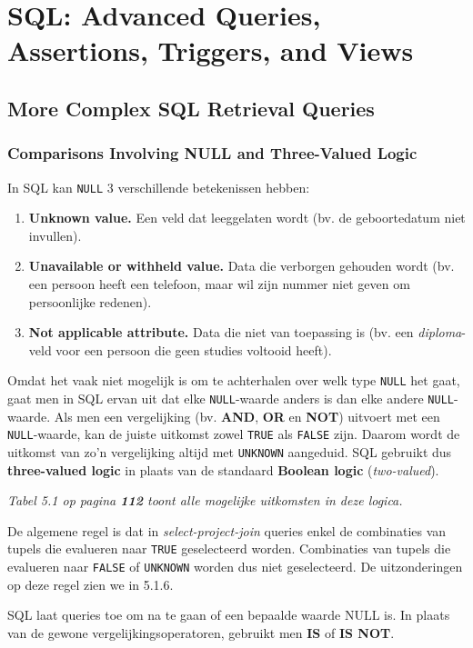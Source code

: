 \chapter{SQL: Advanced Queries, Assertions, Triggers, and Views}
\section{More Complex SQL Retrieval Queries}
\subsection{Comparisons Involving NULL and Three-Valued Logic}
In SQL kan \texttt{NULL} 3 verschillende betekenissen hebben:
\begin{enumerate}
\item \textbf{Unknown value.} Een veld dat leeggelaten wordt (bv. de geboortedatum niet invullen).
\item \textbf{Unavailable or withheld value.} Data die verborgen gehouden wordt (bv. een persoon heeft een telefoon, maar wil zijn nummer niet geven om persoonlijke redenen).
\item \textbf{Not applicable attribute.} Data die niet van toepassing is (bv. een \textit{diploma}-veld voor een persoon die geen studies voltooid heeft).
\end{enumerate}
Omdat het vaak niet mogelijk is om te achterhalen over welk type \texttt{NULL} het gaat, gaat men in SQL ervan uit dat elke \texttt{NULL}-waarde anders is dan elke andere \texttt{NULL}-waarde. Als men een vergelijking (bv. \textbf{AND}, \textbf{OR} en \textbf{NOT}) uitvoert met een \texttt{NULL}-waarde, kan de juiste uitkomst zowel \texttt{TRUE} als \texttt{FALSE} zijn. Daarom wordt de uitkomst van zo'n vergelijking altijd met \texttt{UNKNOWN} aangeduid. SQL gebruikt dus \textbf{three-valued logic} in plaats van de standaard \textbf{Boolean logic} (\textit{two-valued}).

\textit{Tabel 5.1 op pagina \textbf{112} toont alle mogelijke uitkomsten in deze logica.}

De algemene regel is dat in \textit{select-project-join} queries enkel de combinaties van tupels die evalueren naar \texttt{TRUE} geselecteerd worden. Combinaties van tupels die evalueren naar \texttt{FALSE} of \texttt{UNKNOWN} worden dus niet geselecteerd. De uitzonderingen op deze regel zien we in 5.1.6.

SQL laat queries toe om na te gaan of een bepaalde waarde NULL is. In plaats van de gewone vergelijkingsoperatoren, gebruikt men \textbf{IS} of \textbf{IS NOT}.

